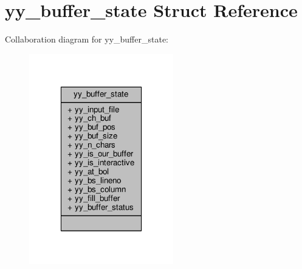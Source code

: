 \hypertarget{structyy__buffer__state}{\section{yy\-\_\-buffer\-\_\-state Struct Reference}
\label{structyy__buffer__state}
}


Collaboration diagram for yy\-\_\-buffer\-\_\-state\-:
\nopagebreak
\begin{figure}[H]
\begin{center}
\leavevmode
\includegraphics[width=178pt]{structyy__buffer__state__coll__graph}
\end{center}
\end{figure}
